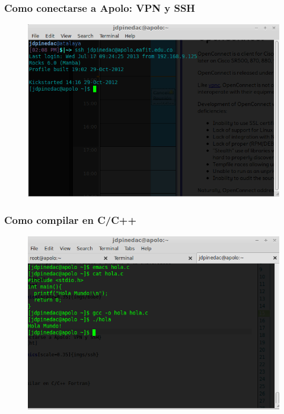 \begin{frame}
\frametitle{Como conectarse a Apolo: VPN y SSH}
      \begin{figure}[ht]
        \centering
        \includegraphics[scale=0.35]{imgs/ssh}
      \end{figure}
\end{frame}

\begin{frame}
\frametitle{Como compilar en C/C++}
      \begin{figure}[ht]
        \centering
        \includegraphics[scale=0.4]{imgs/gcc}
      \end{figure}
\end{frame}

